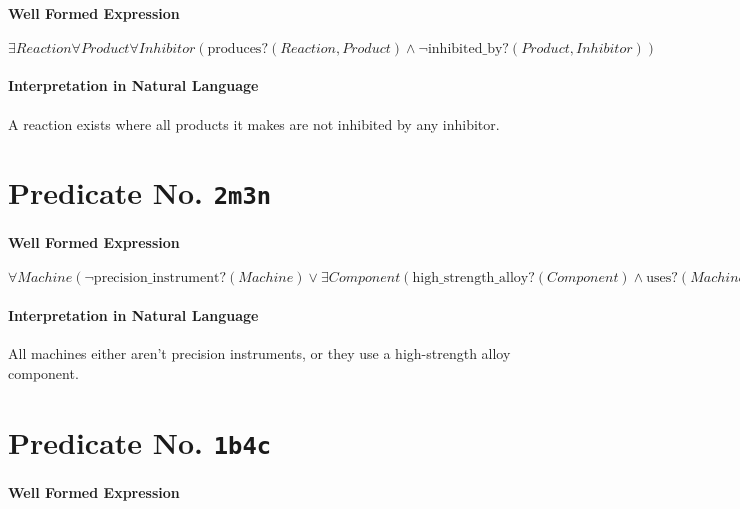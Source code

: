 \documentclass[11pt]{article}
\begin{document}
\paragraph*{Well Formed Expression}
\label{sec:org34d6667}

\(\exists \mathit{Reaction} \forall \mathit{Product} \forall \mathit{Inhibitor} (\mathrm{produces?}(\mathit{Reaction}, \mathit{Product}) \land \neg \mathrm{inhibited\_by?}(\mathit{Product}, \mathit{Inhibitor}))\)

\paragraph*{Interpretation in Natural Language}
\label{sec:org6ab1050}

A reaction exists where all products it makes are not inhibited by any inhibitor.



\section{Predicate No. \texttt{2m3n}}
\label{sec:org8fea4b5}

\paragraph*{Well Formed Expression}
\label{sec:org6cfa369}

\(\forall \mathit{Machine} (\neg \mathrm{precision\_instrument?}(\mathit{Machine}) \lor \exists \mathit{Component} (\mathrm{high\_strength\_alloy?}(\mathit{Component}) \land \mathrm{uses?}(\mathit{Machine}, \mathit{Component})))\)

\paragraph*{Interpretation in Natural Language}
\label{sec:orgae65d24}

All machines either aren't precision instruments, or they use a high-strength alloy component.



\section{Predicate No. \texttt{1b4c}}
\label{sec:org0d7fe00}

\paragraph*{Well Formed Expression}
\label{sec:orgcbeae4d}
\end{document}
